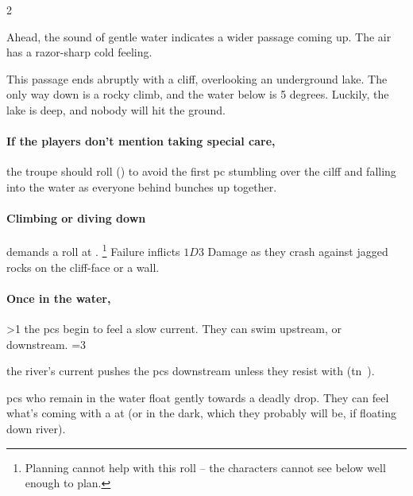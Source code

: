 \begin{multicols}{2}

\begin{boxtext}
  Ahead, the sound of gentle water indicates a wider passage coming up.
  The air has a razor-sharp cold feeling.
\end{boxtext}

This passage ends abruptly with a cliff, overlooking an underground lake.
The only way down is a rocky climb, and the water below is 5 degrees.
Luckily, the lake is deep, and nobody will hit the ground.

\paragraph{If the players don't mention taking special care,}
the troupe should roll  (\tn[5]) to avoid the first \gls{pc} stumbling over the cilff and falling into the water as everyone behind bunches up together.

\paragraph{Climbing or diving down}
demands a  roll at \tn[8].%
\footnote{Planning cannot help with this roll -- the characters cannot see below well enough to plan.}
Failure inflicts $1D3$ Damage as they crash against jagged rocks on the cliff-face or a wall.

\paragraph{Once in the water,}
\ifnum\value{temperature}>1%
  the \glspl{pc} begin to feel a slow current.
  They can swim upstream, or downstream.
\else%
  \ifnum\value{temperature}=3%
    \addtocounter{track}{2}%
  \fi%
  the river's current pushes the \glspl{pc} downstream unless they resist with  (\gls{tn}~).
\fi%





\Glspl{pc} who remain in the water float gently towards a deadly drop.
They can feel what's coming with a  at \tn[7] (or \tn[10] in the dark, which they probably will be, if floating down river).


\end{multicols}
